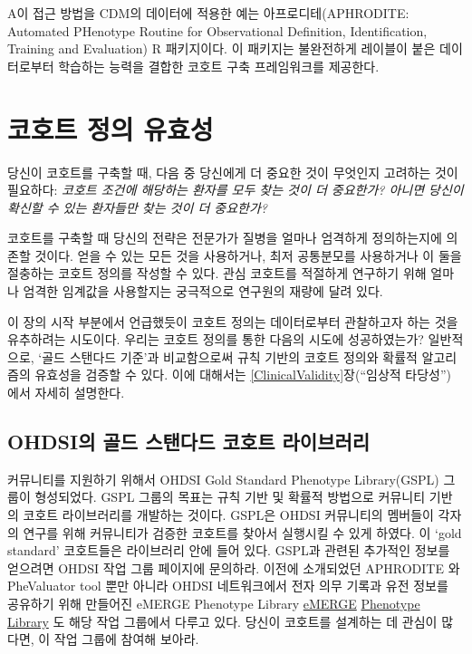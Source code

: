 \documentclass[11pt]{book}
\theoremstyle{definition}
\theoremstyle{definition}
\theoremstyle{definition}
\theoremstyle{remark}
\begin{document}
A이 접근 방법을 CDM의 데이터에 적용한 예는 아프로디테(APHRODITE:
Automated PHenotype Routine for Observational Definition,
Identification, Training and Evaluation) R 패키지이다. 이 패키지는
불완전하게 레이블이 붙은 데이터로부터 학습하는 능력을 결합한 코호트 구축
프레임워크를 제공한다. \citep{Banda2017APHRODITE} 

\section{코호트 정의 유효성}\label{--}

당신이 코호트를 구축할 때, 다음 중 당신에게 더 중요한 것이 무엇인지
고려하는 것이 필요하다: \emph{코호트 조건에 해당하는 환자를 모두 찾는
것이 더 중요한가? 아니면 당신이 확신할 수 있는 환자들만 찾는 것이 더
중요한가?}

코호트를 구축할 때 당신의 전략은 전문가가 질병을 얼마나 엄격하게
정의하는지에 의존할 것이다. 얻을 수 있는 모든 것을 사용하거나, 최저
공통분모를 사용하거나 이 둘을 절충하는 코호트 정의를 작성할 수 있다.
관심 코호트를 적절하게 연구하기 위해 얼마나 엄격한 임계값을 사용할지는
궁극적으로 연구원의 재량에 달려 있다.

이 장의 시작 부분에서 언급했듯이 코호트 정의는 데이터로부터 관찰하고자
하는 것을 유추하려는 시도이다. 우리는 코호트 정의를 통한 다음의 시도에
성공하였는가? 일반적으로, `골드 스탠다드 기준'과 비교함으로써 규칙
기반의 코호트 정의와 확률적 알고리즘의 유효성을 검증할 수 있다. 이에
대해서는 \ref{ClinicalValidity}장(``임상적 타당성'') 에서 자세히
설명한다.

\subsection{OHDSI의 골드 스탠다드 코호트 라이브러리}\label{ohdsi----}

커뮤니티를 지원하기 위해서 OHDSI Gold Standard Phenotype Library(GSPL)
그룹이 형성되었다. GSPL 그룹의 목표는 규칙 기반 및 확률적 방법으로
커뮤니티 기반의 코호트 라이브러리를 개발하는 것이다. GSPL은 OHDSI
커뮤니티의 멤버들이 각자의 연구를 위해 커뮤니티가 검증한 코호트를 찾아서
실행시킬 수 있게 하였다. 이 `gold standard' 코호트들은 라이브러리 안에
들어 있다. GSPL과 관련된 추가적인 정보를 얻으려면 OHDSI 작업 그룹
페이지에 문의하라. 이전에 소개되었던 APHRODITE
\citep{Banda2017APHRODITE} 와 PheValuator tool
\citep{Swerdel2019phevaluator} 뿐만 아니라 OHDSI 네트워크에서 전자 의무
기록과 유전 정보를 공유하기 위해 만들어진 eMERGE Phenotype Library
\href{https://emerge.mc.vanderbilt.edu/}{eMERGE}
\href{https://phekb.org/phenotypes}{Phenotype Library}
\citep{Hripcsak2019eMERGE} 도 해당 작업 그룹에서 다루고 있다. 당신이
코호트를 설계하는 데 관심이 많다면, 이 작업 그룹에 참여해 보아라.
\end{document}
